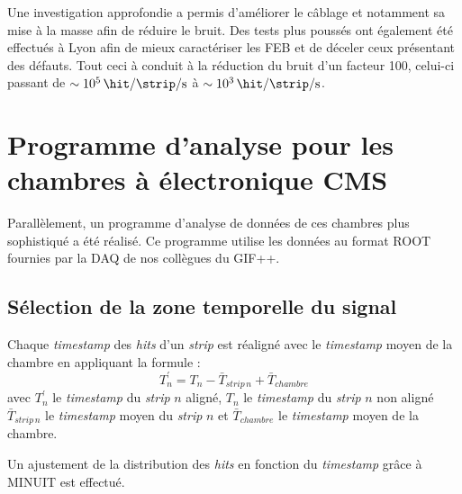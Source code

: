 Une investigation approfondie a permis d'améliorer le câblage et notamment sa mise à la masse afin de réduire le bruit. Des tests plus poussés ont également été effectués à Lyon afin de mieux caractériser les FEB et de déceler ceux présentant des défauts. Tout ceci à conduit à la réduction du bruit d'un facteur \num{100}, celui-ci passant de $\sim\SI{e5}{\hit\per\strip\per\second}$ à $\sim\SI{e3}{\hit\per\strip\per\second}$.
\vspace*{-0.5cm}
\section{Programme d’analyse pour les chambres à électronique CMS}
\vspace*{-0.4cm}
\label{prog}
Parallèlement, un programme d'analyse de données de ces chambres plus sophistiqué a été réalisé. Ce programme utilise les données au format ROOT fournies par la DAQ de nos collègues du GIF++.
\vspace*{-0.4cm}
\subsection{Sélection de la zone temporelle du signal}
\vspace*{-0.4cm}
Chaque \textit{timestamp} des \textit{hits} d'un \textit{strip} est réaligné avec le \textit{timestamp} moyen de la chambre en appliquant la formule :
\begin{equation}
T^{'}_{n}=T_{n}-\bar{T}_{strip\, n}+\bar{T}_{chambre}
\end{equation}
avec $T^{'}_{n}$ le \textit{timestamp} du \textit{strip} $n$ aligné, $T_{n}$ le \textit{timestamp} du \textit{strip} $n$ non aligné $\bar{T}_{strip\, n}$ le \textit{timestamp} moyen du \textit{strip} $n$ et $\bar{T}_{chambre}$ le \textit{timestamp} moyen de la chambre. 

Un ajustement de la distribution des \textit{hits} en fonction du \textit{timestamp} grâce à MINUIT est effectué. 

